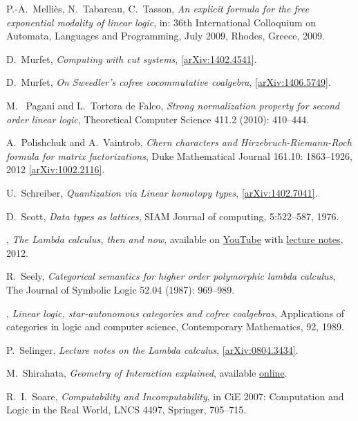 \documentclass[english,letter paper,12pt,reqno]{article}
\theoremstyle{example}
\numberwithin{equation}{section}
\begin{document}
\begin{thebibliography}{BHLS03}
P.-A.~Melli\`{e}s, N.~Tabareau, C.~Tasson, \textsl{An explicit formula for the free exponential modality of linear logic}, in: 36th International Colloquium on Automata, Languages and Programming, July 2009, Rhodes, Greece, 2009.

D.~Murfet, \textsl{Computing with cut systems}, \href{http://arxiv.org/abs/1402.4541}{[arXiv:1402.4541]}.

D.~Murfet, \textsl{On Sweedler's cofree cocommutative coalgebra}, \href{http://arxiv.org/abs/1406.5749}{[arXiv:1406.5749]}.

M.~ Pagani and L.~Tortora de Falco, \textsl{Strong normalization property for second order linear logic}, Theoretical Computer Science 411.2 (2010): 410--444.

A.~Polishchuk and A.~Vaintrob, \textsl{Chern characters and {H}irzebruch-{R}iemann-{R}och formula for matrix factorizations}, Duke Mathematical Journal 161.10: 1863--1926, 2012 \href{http://arxiv.org/abs/1002.2116}{[arXiv:1002.2116]}. 

U.~Schreiber, \textsl{Quantization via {L}inear homotopy types}, \href{http://arxiv.org/abs/1402.7041}{[arXiv:1402.7041]}.

D.~Scott, \textsl{Data types as lattices}, SIAM Journal of computing, 5:522--587, 1976.

\bysame, \textsl{The {L}ambda calculus, then and now}, available on \href{http://www.youtube.com/watch?v=7cPtCpyBPNI}{YouTube} with \href{http://turing100.acm.org/lambda_calculus_timeline.pdf}{lecture notes}, 2012.

R.~Seely, \textsl{Categorical semantics for higher order polymorphic lambda calculus}, The Journal of Symbolic Logic 52.04 (1987): 969--989.

\bysame, \textsl{Linear logic, star-autonomous categories and cofree coalgebras}, Applications of categories in logic and computer science, Contemporary Mathematics, 92, 1989.

P.~Selinger, \textsl{Lecture notes on the {L}ambda calculus}, \href{http://arxiv.org/abs/0804.3434}{[arXiv:0804.3434]}.

M.~Shirahata, \textsl{Geometry of {I}nteraction explained}, available \href{http://www.kurims.kyoto-u.ac.jp/~hassei/algi-13/kokyuroku/19_shirahata.pdf}{online}.

R.~I.~Soare, \textsl{Computability and {I}ncomputability}, in CiE 2007: Computation and Logic in the Real World, LNCS 4497, Springer, 705--715.
  

\end{thebibliography}
\end{document}
